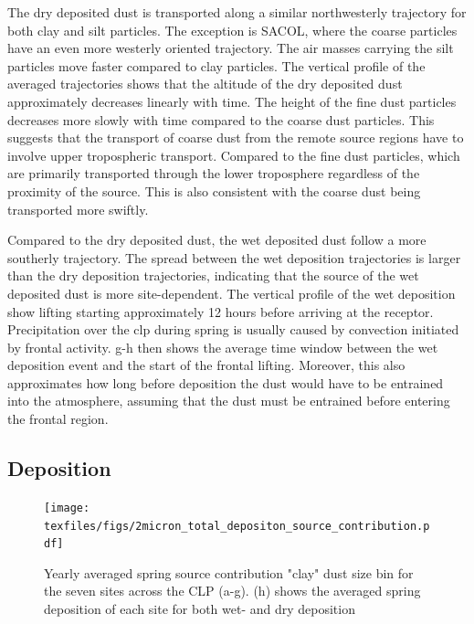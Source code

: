 The dry deposited dust is transported along a similar northwesterly trajectory for both clay and silt particles. 
The exception is SACOL, where the coarse particles have an even more westerly oriented trajectory. 
The air masses carrying the silt particles move faster compared to clay particles.  
The vertical profile of the averaged trajectories shows that the altitude of the dry deposited dust approximately decreases linearly with time. 
The height of the fine dust particles decreases more slowly with time compared to the coarse dust particles. 
This suggests that the transport of coarse dust from the remote source regions have to involve upper tropospheric transport. 
Compared to the fine dust particles, which are primarily transported through the lower troposphere regardless of the proximity of the source. 
This is also consistent with the coarse dust being transported more swiftly.  

Compared to the dry deposited dust, the wet deposited dust follow a more southerly trajectory.
The spread between the wet deposition trajectories is larger than the dry deposition trajectories, indicating that the source of the wet deposited dust is more site-dependent.
The vertical profile of the wet deposition show lifting starting approximately 12 hours before arriving at the receptor. 
Precipitation over the \acrshort{clp} during spring is usually caused by convection initiated by frontal activity. g-h then shows the average time window between the wet deposition event and the start of the frontal lifting. Moreover, this also approximates how long before deposition the dust would have to be entrained into the atmosphere, assuming that the dust must be entrained before entering the frontal region.  
\subsection{Deposition}
\begin{figure}[htbp]
    \centering
    \texttt{[image: texfiles/figs/2micron\_total\_depositon\_source\_contribution.pdf]}
    \caption{Yearly averaged spring source contribution "clay" dust size bin for the seven sites across the CLP (a-g). (h) shows the averaged spring deposition of each site for both wet- and dry deposition}
    \label{fig:source_contrib_2mmu}
\end{figure}

